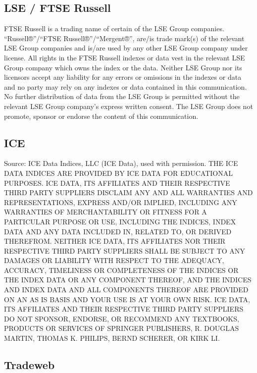 \documentclass[graybox,envcountchap,sectrefs]{svmono}\usepackage[]{graphicx}\usepackage[]{xcolor}
\begin{document}
\subsection*{LSE / FTSE Russell}

FTSE Russell is a trading name of certain of the LSE Group companies.
“Russell®”/“FTSE Russell®”/“Mergent®”, are/is trade mark(s) of the
relevant LSE Group companies and is/are used by any other LSE Group
company under license. All rights in the FTSE Russell indexes or data
vest in the relevant LSE Group company which owns the index or the
data. Neither LSE Group nor its licensors accept any liability for
any errors or omissions in the indexes or data and no party may rely
on any indexes or data contained in this communication. No further
distribution of data from the LSE Group is permitted without the relevant
LSE Group company’s express written consent. The LSE Group does not
promote, sponsor or endorse the content of this communication.

\subsection*{ICE}

Source: ICE Data Indices, LLC (\textquotedbl ICE Data\textquotedbl ),
used with permission. THE ICE DATA INDICES ARE PROVIDED BY ICE DATA
FOR EDUCATIONAL PURPOSES. ICE DATA, ITS AFFILIATES AND THEIR RESPECTIVE
THIRD PARTY SUPPLIERS DISCLAIM ANY AND ALL WARRANTIES AND REPRESENTATIONS,
EXPRESS AND/OR IMPLIED, INCLUDING ANY WARRANTIES OF MERCHANTABILITY
OR FITNESS FOR A PARTICULAR PURPOSE OR USE, INCLUDING THE INDICES,
INDEX DATA AND ANY DATA INCLUDED IN, RELATED TO, OR DERIVED THEREFROM.
NEITHER ICE DATA, ITS AFFILIATES NOR THEIR RESPECTIVE THIRD PARTY
SUPPLIERS SHALL BE SUBJECT TO ANY DAMAGES OR LIABILITY WITH RESPECT
TO THE ADEQUACY, ACCURACY, TIMELINESS OR COMPLETENESS OF THE INDICES
OR THE INDEX DATA OR ANY COMPONENT THEREOF, AND THE INDICES AND INDEX
DATA AND ALL COMPONENTS THEREOF ARE PROVIDED ON AN \textquotedbl AS
IS\textquotedbl{} BASIS AND YOUR USE IS AT YOUR OWN RISK. ICE DATA,
ITS AFFILIATES AND THEIR RESPECTIVE THIRD PARTY SUPPLIERS DO NOT SPONSOR,
ENDORSE, OR RECOMMEND ANY TEXTBOOKS, PRODUCTS OR SERVICES OF SPRINGER
PUBLISHERS, R. DOUGLAS MARTIN, THOMAS K. PHILIPS, BERND SCHERER, OR
KIRK LI.

\subsection*{Tradeweb}
\end{document}
